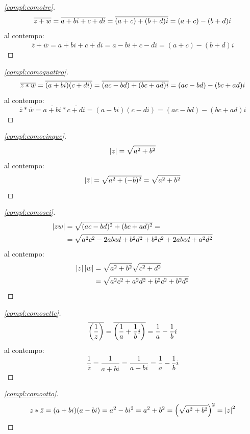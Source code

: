 \begin{proof}[\ref{compl:comotre}]
	\begin{equation*}
		\overline{z+w}=\overline{a+bi+c+di}=\overline{(a+c)+(b+d)i}=(a+c)-(b+d)i\\
	\end{equation*}
	\center al contempo:
	\begin{equation*}
		\bar z+\bar w= \overline{a+bi}+\overline{c+di}=a-bi+c-di=(a+c)-(b+d)i
	\end{equation*}
\end{proof}
\begin{proof}[\ref{compl:comoquattro}]
	\begin{equation*}
		\overline{z*w}=\overline{(a+bi)(c+di)}=\overline{(ac-bd)+(bc+ad)i}=(ac-bd)-(bc+ad)i\\
	\end{equation*}
	\center al contempo:
	\begin{equation*}
		\bar z*\bar w=\overline{a+bi}*\overline{c+di}=(a-bi)(c-di)=(ac-bd)-(bc+ad)i
	\end{equation*}
\end{proof}
\begin{proof}[\ref{compl:comocinque}]
	\begin{equation*}
		\left\lvert z \right\rvert = \sqrt{a^2 + b^2} \\
	\end{equation*}
	\center al contempo:
	\begin{equation*}
		\left\lvert \bar z \right\rvert = \sqrt{a^2 + ( -b )^2} = \sqrt{a^2 + b^2}
	\end{equation*}
\end{proof}
\begin{proof}[\ref{compl:comosei}]
	\begin{align*}
		\left\lvert zw \right\rvert & = \sqrt{(ac-bd)^2+(bc+ad)^2} =                   \\
		         & = \sqrt{a^2c^2-2abcd+b^2d^2+b^2c^2+2abcd+a^2d^2} \\
	\end{align*}
	\center al contempo:
	\begin{align*}
		\left\lvert z \right\rvert\left\lvert w \right\rvert & = \sqrt{a^2+b^2}\sqrt{c^2+d^2}      \\
		               & =\sqrt{a^2c^2+a^2d^2+b^2c^2+b^2d^2}
	\end{align*}
\end{proof}
\begin{proof}[\ref{compl:comosette}]
	\begin{equation*}
		\overline{\left(\frac{1}{z}\right)}=\overline{\left(\frac{1}{a}+\frac{1}{b}i\right)}=\frac{1}{a}-\frac{1}{b}i\\
	\end{equation*}
	\center al contempo:
	\begin{equation*}
		\frac{1}{\bar z}=\frac{1}{\overline{a+bi}}=\frac{1}{a-bi}=\frac{1}{a}-\frac{1}{b}i
	\end{equation*}
\end{proof}
\begin{proof}[\ref{compl:comootto}]
	\begin{gather*}
		z*\bar z=(a+bi)(a-bi)=a^2-bi^2=a^2+b^2=\left(\sqrt{a^2+b^2}\right)^2=\left\lvert z \right\rvert^2
	\end{gather*}
\end{proof}


